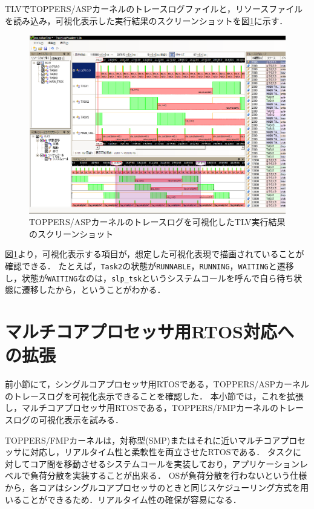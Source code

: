 TLVでTOPPERS/ASPカーネルのトレースログファイルと，リソースファイルを読み込み，可視化表示した実行結果のスクリーンショットを図\ref{fig:aspTLVscreenShot}に示す．

\begin{figure}[tb]
\begin{center}
\includegraphics[width=15cm]{img/aspTLVscreenShot.eps}
\caption{TOPPERS/ASPカーネルのトレースログを可視化したTLV実行結果のスクリーンショット}
\label{fig:aspTLVscreenShot}
\end{center}
\end{figure}

図\ref{fig:aspTLVscreenShot}より，可視化表示する項目が，想定した可視化表現で描画されていることが確認できる．
たとえば，{\tt Task2}の状態が{\tt RUNNABLE}，{\tt RUNNING}，{\tt WAITING}と遷移し，状態が{\tt WAITING}なのは，{\tt slp\_tsk}というシステムコールを呼んで自ら待ち状態に遷移したから，ということがわかる．

\section{マルチコアプロセッサ用RTOS対応への拡張}

前小節にて，シングルコアプロセッサ用RTOSである，TOPPERS/ASPカーネルのトレースログを可視化表示できることを確認した．
本小節では，これを拡張し，マルチコアプロセッサ用RTOSである，TOPPERS/FMPカーネル\cite{TOPPERS}のトレースログの可視化表示を試みる．

TOPPERS/FMPカーネルは，対称型(SMP)またはそれに近いマルチコアプロセッサに対応し，リアルタイム性と柔軟性を両立させたRTOSである．
タスクに対してコア間を移動させるシステムコールを実装しており，アプリケーションレベルで負荷分散を実装することが出来る．
OSが負荷分散を行わないという仕様から，各コアはシングルコアプロセッサのときと同じスケジューリング方式を用いることができるため．リアルタイム性の確保が容易になる．


